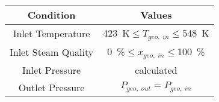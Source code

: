 \begin{tabular}{|c | c |}
    \hline
    \rowcolor{bluepoli!40} %
    \textbf{Condition} & \textbf{Values} \T\B \\
    \hline \hline
    Inlet Temperature & \qty{423}{\K}\(\leq T_{geo,\;in}\leq\)\qty{548}{\K} \T\B \\
    Inlet Steam Quality & \qty{0}{\percent}\(\leq x_{geo,\;in}\leq\)\qty{100}{\percent} \T\B \\
    Inlet Pressure & calculated \T\B \\
    Outlet Pressure &  \(P_{geo,\;out} = P_{geo,\;in}\) \T\B \\
    \hline
\end{tabular}